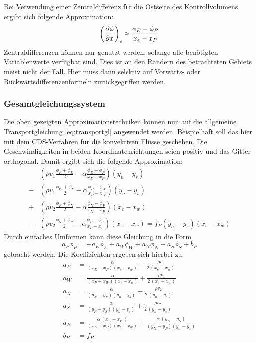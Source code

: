 Bei Verwendung einer Zentraldifferenz für die Ostseite des Kontrollvolumens ergibt sich folgende
Approximation:
\begin{equation}
  \left({\pder[\phi]{x}}\right)_e \approx \frac{\phi_E -\phi_P}{x_e-x_P}
\end{equation}
Zentraldifferenzen können nur genutzt werden, solange alle benötigten Variablenwerte
verfügbar sind. Dies ist an den Rändern des betrachteten Gebiets meist nicht der Fall.
Hier muss dann selektiv auf Vorwärts- oder Rückwärtsdifferenzenformeln zurückgegriffen werden.


\subsubsection{Gesamtgleichungssystem}

Die oben gezeigten Approximationstechniken können nun auf die allgemeine Transportgleichung
\eqref{eq:transportgl} angewendet werden. Beispielhaft soll das hier mit dem CDS-Verfahren für
die konvektiven Flüsse geschehen. Die Geschwindigkeiten in beiden Koordinatenrichtungen seien positiv
und das Gitter orthogonal. Damit ergibt sich die folgende Approximation:
\begin{align*}
  &\left({\rho v_1 \frac{\phi_P+\phi_E}{2} - \alpha \frac{\phi_E-\phi_P}{x_E-x_P}}\right) (y_n-y_s)\\
  -&\left({\rho v_1 \frac{\phi_W+\phi_P}{2} - \alpha \frac{\phi_P-\phi_W}{x_P-x_W}}\right) (y_n-y_s)\\
  +&\left({\rho v_2 \frac{\phi_P+\phi_N}{2} - \alpha \frac{\phi_N-\phi_P}{x_N-x_P}}\right) (x_e-x_w)\\
  -&\left({\rho v_2 \frac{\phi_S+\phi_P}{2} - \alpha \frac{\phi_P-\phi_S}{x_P-x_S}}\right) (x_e-x_w)=
  f_P (y_n-y_s)(x_e-x_w)
\end{align*}
Durch einfaches Umformen kann diese Gleichung in die Form
\begin{equation}
  a_P\phi_P = + a_E\phi_E + a_W\phi_W + a_N\phi_N + a_S\phi_S + b_P
  \label{eq:fvm_kv}
\end{equation}
gebracht werden.
Die Koeffizienten ergeben sich hierbei zu:
\begin{align*}
  a_E &= \frac{\alpha}{(x_E-x_P)(x_e-x_w)} - \frac{\rho v_1}{2\,(x_e-x_w)}\\
  a_W &= \frac{\alpha}{(x_P-x_W)(x_e-x_w)} + \frac{\rho v_1}{2\,(x_e-x_w)}\\
  a_N &= \frac{\alpha}{(y_N-y_P)(y_n-y_s)} - \frac{\rho v_2}{2\,(y_n-y_s)}\\
  a_S &= \frac{\alpha}{(y_P-y_S)(y_n-y_s)} + \frac{\rho v_2}{2\,(y_n-y_s)}\\
  a_P &= \frac{\alpha\, (x_E-x_W)}{(x_E-x_P)(x_e-x_w)} + \frac{\alpha\, (y_N-y_S)}{(y_N-y_P)(y_n-y_s)}\\
  b_P &= f_P
\end{align*}
